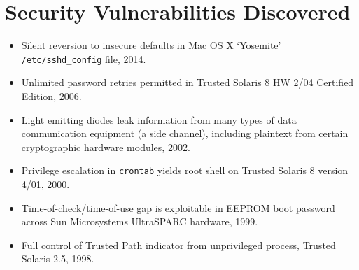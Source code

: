 \vspace{2mm}
\section*{Security Vulnerabilities Discovered}

\vspace{-2mm}
\begin{itemize}
    \item Silent reversion to insecure defaults in Mac OS X `Yosemite'
        \texttt{/etc/sshd\_config} file, 2014.\vspace{-2.5mm}
	\item Unlimited password retries permitted in Trusted Solaris 8 HW 2/04
		Certified Edition, 2006.\vspace{-2.5mm}
	\item Light emitting diodes leak information from many types of data
		communication equipment (a side channel), including plaintext from
		certain cryptographic hardware modules, 2002.\vspace{-2.5mm}
	\item Privilege escalation in \verb,crontab, yields root shell on Trusted
		Solaris 8 version 4/01, 2000.\vspace{-2.5mm}
    \item Time-of-check/time-of-use gap is exploitable in EEPROM boot
        password across Sun Microsystems UltraSPARC hardware, 1999.\vspace{-2.5mm}
	\item Full control of Trusted Path indicator from unprivileged process,
		Trusted Solaris 2.5, 1998.\vspace{-2.5mm}
\end{itemize}

